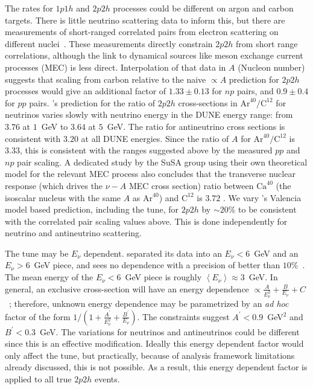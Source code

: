 The rates for $1p1h$ and $2p2h$ processes could be different on argon and carbon targets.  There is little neutrino scattering data to inform this, but there are measurements of short-ranged correlated pairs from electron scattering on different nuclei~\cite{Colle:2015ena}.  These measurements directly constrain $2p2h$ from short range correlations, although the link to dynamical sources like meson exchange current processes (MEC) is less direct. Interpolation of that data in $A$ (Nucleon number) suggests that scaling from carbon relative to the naive $\propto A$ prediction for $2p2h$ processes would give an additional factor of $1.33\pm 0.13$ for $np$ pairs, and $0.9\pm 0.4$ for $pp$ pairs.
's prediction for the ratio of $2p2h$ cross-sections in $\text{Ar}^{40}/\text{C}^{12}$ for neutrinos varies slowly with neutrino energy in the DUNE energy range: from $3.76$ at $1$~GeV to $3.64$ at $5$~GeV. The ratio for antineutrino cross sections is consistent with $3.20$ at all DUNE energies. Since the ratio of $A$ for $\text{Ar}^{40}/\text{C}^{12}$ is $3.33$, this is consistent with the ranges suggested above by the measured $pp$ and $np$ pair scaling.  A dedicated study by the SuSA group using their own theoretical model for the relevant MEC process also concludes that the transverse nuclear response (which drives the $\nu-A$ MEC cross section) ratio between $\text{Ca}^{40}$ (the isoscalar nucleus with the same $A$ as $\text{Ar}^{40}$) and $\text{C}^{12}$ is $3.72$ \cite{Amaro:2017eah}. We vary 's Valencia model based prediction, including the \minerva tune, for $2p2h$ by $\sim 20\%$ to be consistent with the correlated pair scaling values above. This is done independently for neutrino and antineutrino scattering.

The \minerva tune may be $E_\nu$ dependent. \minerva separated its data into an $E_\nu<6$~GeV and an $E_\nu>$6~GeV piece, and sees no dependence with a precision of better than $10\%$~\cite{Rodrigues:2015hik}.  The mean energy of the $E_\nu<6$~GeV piece is roughly $\left< E_\nu\right>\approx 3$~GeV.  In general, an exclusive cross-section will have an energy dependence $\propto \frac{A}{E_\nu^2}+\frac{B}{E_\nu}+C$~\cite{llewelyn-smith}; therefore, unknown energy dependence may be parametrized by an {\em ad hoc} factor of the form $1/\left(1+ \frac{A^{'}}{E_\nu^2 }+\frac{B^{'}}{E_\nu}\right)$.  The \minerva constraints suggest $A^{'}<0.9$~GeV$^2$ and $B^{'}<0.3$~GeV.  The variations for neutrinos and antineutrinos could be different since this is an effective modification. Ideally this energy dependent factor would only affect the \minerva tune, but practically, because of analysis framework limitations already discussed, this is not possible. As a result, this energy dependent factor is applied to all true $2p2h$ events.

